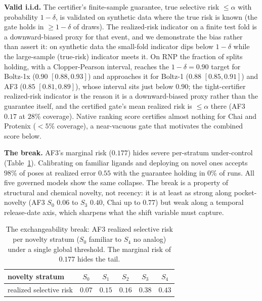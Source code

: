 \documentclass[10pt]{article}
\begin{document}
\textbf{Valid i.i.d.} The certifier's finite-sample guarantee, true selective risk $\le\alpha$ with
probability $1-\delta$, is validated on synthetic data where the true risk is known (the gate holds in
$\ge 1-\delta$ of draws). The realized-risk indicator on a finite test fold is a downward-biased proxy
for that event, and we demonstrate the bias rather than assert it: on synthetic data the small-fold
indicator dips below $1-\delta$ while the large-sample (true-risk) indicator meets it. On RNP the
fraction of splits holding, with a Clopper-Pearson interval, reaches the $1-\delta=0.90$ target for
Boltz-1x ($0.90$ $[0.88,0.93]$) and approaches it for Boltz-1 ($0.88$ $[0.85,0.91]$) and AF3 ($0.85$
$[0.81,0.89]$), whose interval sits just below $0.90$; the tight-certifier realized-risk indicator is
the reason it is a downward-biased proxy rather than the guarantee itself, and the certified gate's
mean realized risk is $\le\alpha$ there (AF3 $0.17$ at $28\%$ coverage). Native ranking score certifies
almost nothing for Chai and Protenix ($<5\%$ coverage), a near-vacuous gate that motivates the
combined score below.

\textbf{The break.} AF3's marginal risk ($0.177$) hides severe per-stratum under-control
(Table~\ref{tab:break}). Calibrating on familiar ligands and deploying on novel ones accepts $98\%$ of
poses at realized error $0.55$ with the guarantee holding in $0\%$ of runs. All five governed models
show the same collapse. The break is a property of structural and chemical novelty, not recency: it is
at least as strong along pocket-novelty (AF3 $S_0$ $0.06$ to $S_3$ $0.40$, Chai up to $0.77$) but weak
along a temporal release-date axis, which sharpens what the shift variable must capture.

\begin{table}[t]
\centering
\caption{The exchangeability break: AF3 realized selective risk per novelty stratum ($S_0$ familiar to
$S_4$ no analog) under a single global threshold. The marginal risk of $0.177$ hides the tail.}
\label{tab:break}
\begin{tabular}{lccccc}
\toprule
novelty stratum & $S_0$ & $S_1$ & $S_2$ & $S_3$ & $S_4$ \\
\midrule
realized selective risk & $0.07$ & $0.15$ & $0.16$ & $\mathbf{0.38}$ & $\mathbf{0.43}$ \\
\bottomrule
\end{tabular}
\end{table}
\end{document}
